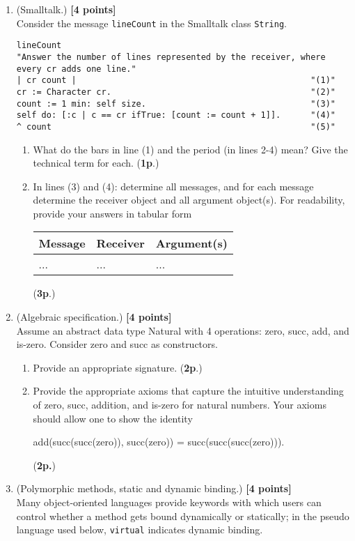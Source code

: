 \documentclass{article}
\begin{document}
\begin{enumerate}
\item (Smalltalk.) 
\hfill{\textbf{[4 points]}}
\\
Consider the message \texttt{lineCount} in the Smalltalk class \texttt{String}.

{\small 
\begin{verbatim}
lineCount 
"Answer the number of lines represented by the receiver, where 
every cr adds one line." 
| cr count |                                               "(1)"
cr := Character cr.                                        "(2)"
count := 1 min: self size.                                 "(3)"
self do: [:c | c == cr ifTrue: [count := count + 1]].      "(4)"
^ count                                                    "(5)"

\end{verbatim}
}
\begin{enumerate}
\item What do the bars in line (1) and the period (in lines 2-4) 
mean? Give the technical term for each. (\textbf{1p}.)
\item In lines (3) and (4): determine all messages, and 
for each message determine the receiver object and all 
argument object(s). For readability,
provide your answers in tabular form
\begin{center}
\begin{tabular}{lll}
Message & Receiver & Argument(s) \\ \hline
...     & ...      & ...     \\
\end{tabular}
\end{center}   (\textbf{3p}.)
\end{enumerate} 

\item (Algebraic specification.)  \hfill{\textbf{[4 points]}}
\\
Assume an abstract data type Natural with 4 
operations: zero,
succ, add, and is-zero. Consider zero and succ as constructors.
\begin{enumerate}
\item Provide an appropriate signature. (\textbf{2p}.)
\item Provide the appropriate axioms that capture the intuitive 
understanding of zero, succ, addition, and is-zero for natural numbers.
Your axioms should allow one to show the identity

\begin{center}
{add(succ(succ(zero)), succ(zero)) = succ(succ(succ(zero)))}.
\end{center} 
(\textbf{2p.})
\end{enumerate}
\newpage
\item (Polymorphic methods, static and dynamic binding.)
\hfill{\textbf{[4 points]}}
\\
Many object-oriented languages provide keywords with which  
users can control whether a method gets bound dynamically or
statically; in the pseudo language used below, \texttt{virtual}
indicates dynamic binding. 


\end{enumerate}
\end{document}
